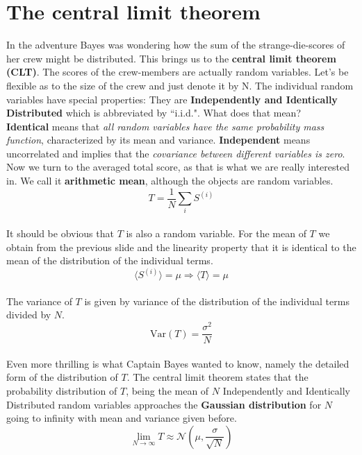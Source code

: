 \documentclass[12pt, a4paper]{scrartcl}
\begin{document}
\section*{The central limit theorem}
In the adventure Bayes was wondering how the sum of the strange-die-scores of her crew might be distributed. This brings us to the  \textbf{central limit theorem (CLT)}. 
The scores of the crew-members are actually random variables.
Let’s be flexible as to the size of the crew and just denote it by N.
The individual random variables have special properties: 
They are  \textbf{Independently and Identically Distributed} which is abbreviated by ``i.i.d.".
What does that mean?\\
\textbf{Identical} means that \textit{all random variables have the same probability mass function}, characterized by its mean and variance.
 \textbf{Independent} means uncorrelated and implies that the \textit{covariance between different variables is zero}. 
Now we turn to the averaged total score, as that is what we are really interested in.
We call it  \textbf{arithmetic mean}, although the objects are random variables.
\begin{equation*}\boxed{T = \frac 1N \sum_iS^{(i)}
}\end{equation*}\\
It should be obvious that $T$ is also a random variable. 
For the mean of $T$ we obtain from the previous slide and the linearity property that it is identical to the mean of the distribution of the individual terms.
\begin{equation*}\boxed{\langle S^{(i)} \rangle = \mu \Rightarrow \langle T\rangle = \mu
}\end{equation*}\\
The variance of $T$ is given by variance of the distribution of the individual terms divided by $N$.
\begin{equation*}\boxed{\text{Var}(T)=\frac{\sigma^2}{N}
}\end{equation*}\\
Even more thrilling is what Captain Bayes wanted to know, namely the detailed form of the distribution of $T$. The central limit theorem states that the probability distribution of $T$, being the mean of $N$ Independently and Identically Distributed random variables approaches the  \textbf{Gaussian distribution} for $N$ going to infinity with mean and variance given before.
\begin{equation*}\boxed{\lim_{N\rightarrow \infty} T \approx \mathcal{N}\left(\mu, \frac{\sigma}{\sqrt{N}}\right)}\end{equation*}\\
\end{document}
